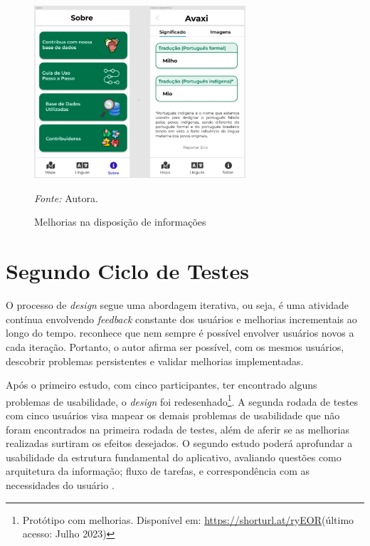 \begin{figure}[h!]
	\centering
	\caption{Melhorias na disposição de informações}
	\begin{adjustbox}{center}
		\includegraphics[width=0.7\textwidth]{figuras/melhorias.eps}
	\end{adjustbox}
	\begin{tablenotes}[flushleft]
		\centering
		\item \textit{Fonte:} Autora.
	\end{tablenotes}
	\label{fig27}
\end{figure}


\section{Segundo Ciclo de Testes}
\label{sec:Segundo Ciclo}
O processo de \textit{design} segue uma abordagem iterativa, ou seja, é uma atividade contínua envolvendo \textit{feedback} constante dos usuários e melhorias incrementais ao longo do tempo.  
reconhece que nem sempre é possível envolver usuários novos a cada iteração. Portanto, o autor afirma ser possível, com os mesmos usuários, descobrir problemas persistentes e validar melhorias implementadas. 

Após o primeiro estudo, com cinco participantes, ter encontrado alguns problemas de usabilidade, o \textit{design} foi redesenhado\footnote{Protótipo com melhorias. Disponível em: \url{https://shorturl.at/ryEOR}(último acesso: Julho 2023)}. 
A segunda rodada de testes com cinco usuários visa mapear os demais problemas de usabilidade que não foram encontrados na primeira rodada de testes, além de aferir se as melhorias realizadas surtiram os efeitos desejados. O segundo estudo poderá aprofundar a 
usabilidade da estrutura fundamental do aplicativo, avaliando questões como arquitetura da informação; fluxo de tarefas, e correspondência com as necessidades do usuário \cite{usabilitytest}.

